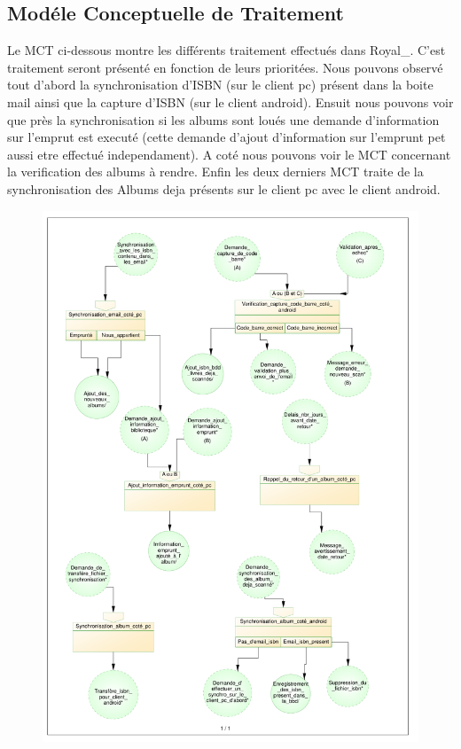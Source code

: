 \subsection{Modéle Conceptuelle de Traitement}

Le MCT ci-dessous montre les différents traitement effectués dans Royal\_. C'est traitement seront présenté en fonction de leurs prioritées.
Nous pouvons observé tout d'abord la synchronisation d'ISBN (sur le client pc) présent dans la boite mail ainsi que la capture d'ISBN (sur le client android).
Ensuit nous pouvons voir que près la synchronisation si les albums sont loués une demande d'information sur l'emprut est executé (cette demande d'ajout d'information sur l'emprunt pet aussi etre effectué independament).
A coté nous pouvons voir le MCT concernant la verification des albums à rendre.
Enfin les deux derniers MCT traite de la synchronisation des Albums deja présents sur le client pc avec le client android.


\begin{figure}[h!]
\begin{center}
\includegraphics[width=14cm]{MCT_Royal.pdf}
\end{center}
\end{figure}
\newpage{}

